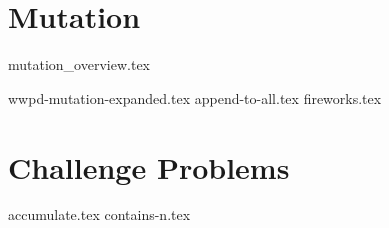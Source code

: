 \documentclass{exam}
\begin{document}
\newpage
\section{Mutation}
{mutation_overview.tex}
\begin{questions}
{wwpd-mutation-expanded.tex}
{append-to-all.tex}
\newpage
{fireworks.tex}

\end{questions}

\newpage
\section{Challenge Problems}
\begin{questions}
{accumulate.tex}
{contains-n.tex}
\end{questions}
\end{document}
